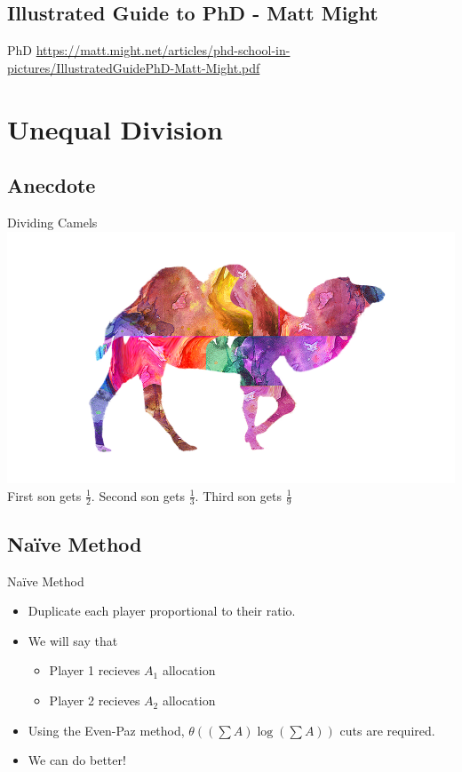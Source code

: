 \documentclass[aspectratio=169,xcolor=dvipsnames]{beamer}
\begin{document}
\subsection{Illustrated Guide to PhD - Matt Might}
\begin{frame}{PhD}
	\url{https://matt.might.net/articles/phd-school-in-pictures/IllustratedGuidePhD-Matt-Might.pdf}
\end{frame}
\section{Unequal Division}
\subsection{Anecdote}
\begin{frame}{Dividing Camels}
	\includegraphics[width=0.78\linewidth]{Camel}\\
	First son gets $\frac{1}{2}$. Second son gets $\frac{1}{3}$. Third son gets $\frac{1}{9}$
\end{frame}
\subsection{Na{\"i}ve Method}
\begin{frame}{Na{\"i}ve Method}
	\begin{itemize}
		\item Duplicate each player proportional to their ratio.\pause
		\item We will say that 
		\begin{itemize}
			\item Player 1 recieves $A_1$ allocation
			\item Player 2 recieves $A_2$ allocation
		\end{itemize}\pause
		\item Using the Even-Paz method, $\theta((\sum A)\log(\sum A))$ cuts are required.\newline
		\item We can do better!
	\end{itemize}
\end{frame}
\end{document}

